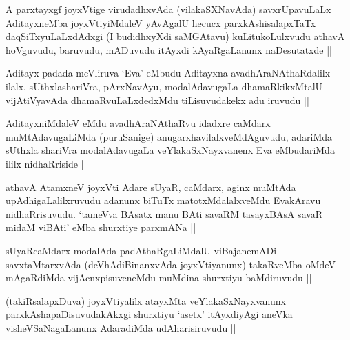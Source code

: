 \begin{artha}
A parxtayxgf joyxVtige virudadhxvAda (vilakaSXNavAda) savxrUpavuLaLx AditayxneMba joyxVtiyiMdaleV yAvAgalU hecucx parxkAshisalapxTaTx daqSiTxyuLaLxdAdxgi (I budidhxyXdi saMGAtavu) kuLitukoLulxvudu athavA hoVguvudu, baruvudu, mADuvudu itAyxdi kAyaRgaLanunx naDesutatxde ||
\end{artha}

\begin{artha}
Aditayx padada meVliruva `Eva' eMbudu Aditayxna avadhAraNAthaRdalilx ilalx, sUthxlashariVra, pArxNavAyu, modalAdavugaLa dhamaRkikxMtalU vijAtiVyavAda dhamaRvuLaLxdedxMdu tiLisuvudakekx adu iruvudu ||
\end{artha}

\begin{artha}
AditayxniMdaleV eMdu avadhAraNAthaRvu idadxre caMdarx muMtAdavugaLiMda (puruSanige) anugarxhavilalxveMdAguvudu, adariMda sUthxla shariVra modalAdavugaLa veYlakaSxNayxvanenx Eva eMbudariMda ililx nidhaRriside ||
\end{artha}

\begin{artha}
athavA AtamxneV joyxVti Adare sUyaR, caMdarx, aginx muMtAda upAdhigaLalilxruvudu adanunx biTuTx matotxMdalalxveMdu EvakAravu nidhaRrisuvudu. `tameVva BAsatx manu BAti savaRM tasayxBAsA savaR midaM viBAti' eMba shurxtiye parxmANa ||
\end{artha}

\begin{artha}
sUyaRcaMdarx modalAda padAthaRgaLiMdalU viBajanemADi savxtaMtarxvAda (deVhAdiBinanxvAda joyxVtiyanunx) takaRveMba oMdeV mAgaRdiMda vijAcnxpisuveneMdu muMdina shurxtiyu baMdiruvudu ||
\end{artha}

\begin{artha}
(takiRsalapxDuva) joyxVtiyalilx atayxMta veYlakaSxNayxvanunx parxkAshapaDisuvudakAkxgi shurxtiyu `asetx' itAyxdiyAgi aneVka visheVSaNagaLanunx AdaradiMda udAharisiruvudu ||
\end{artha}

